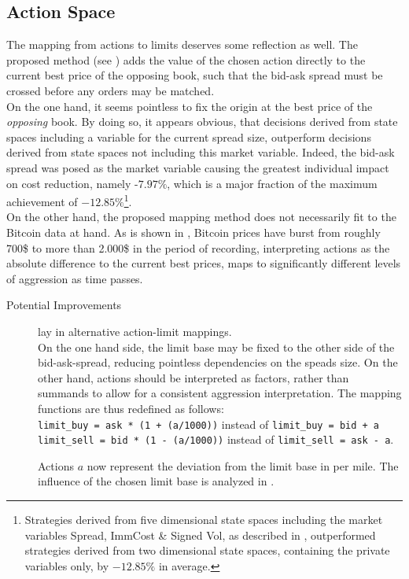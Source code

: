 \subsection{Action Space}
\label{chap:backwardalgorithm:discussion:actionspace}
The mapping from actions to limits deserves some reflection as well. The proposed method (see ) adds the value of the chosen action directly to the current best price of the opposing book, such that the bid-ask spread must be crossed before any orders may be matched.\\

On the one hand, it seems pointless to fix the origin at the best price of the \emph{opposing} book. By doing so, it appears obvious, that decisions derived from state spaces including a variable for the current spread size, outperform decisions derived from state spaces not including this market variable. Indeed, the  bid-ask spread was posed as the market variable causing the greatest individual impact on cost reduction, namely -$7.97\%$, which is a major fraction of the maximum achievement of  $-12.85\%$\footnote{Strategies derived from five dimensional state spaces including the market variables Spread, ImmCost \& Signed Vol, as described in , outperformed strategies derived from two dimensional state spaces, containing the private variables only, by $-12.85\%$ in average.}.\\

On the other hand, the proposed mapping method does not necessarily fit to the Bitcoin data at hand. As is shown in , Bitcoin prices have burst from roughly 700\$ to more than 2.000\$ in the period of recording, \ie interpreting actions as the absolute difference to the current best prices, maps to significantly different levels of aggression as time passes.


\begin{description}
\item[Potential Improvements] lay in alternative action-limit mappings.\\
On the one hand side, the limit base may be fixed to the other side of the bid-ask-spread, reducing pointless dependencies on the speads size. On the other hand, actions should be interpreted as factors, rather than summands to allow for a consistent aggression interpretation. 
The mapping functions are thus redefined as follows:\\
\lstinline!limit_buy = ask * (1 + (a/1000))! instead of \lstinline!limit_buy = bid + a!\\
\lstinline!limit_sell = bid * (1 - (a/1000))! instead of \lstinline!limit_sell = ask - a!.

Actions $a$ now represent the deviation from the limit base in per mile. The influence of the chosen limit base is analyzed in .
\end{description}


\cleardoublepage{}